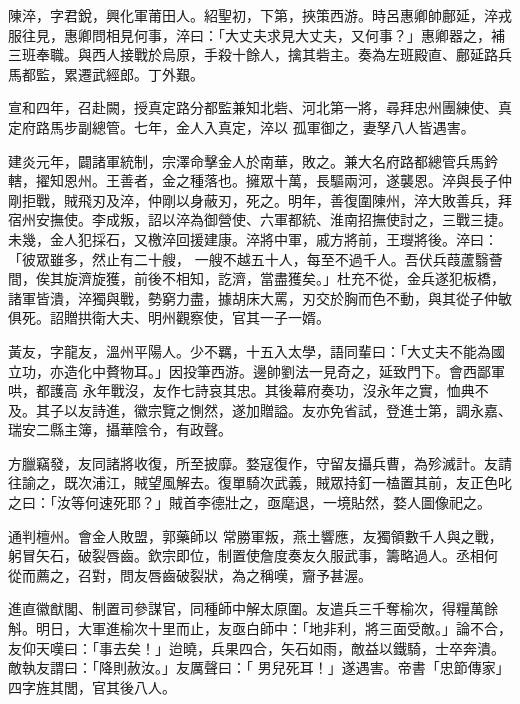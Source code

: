 \begin{pinyinscope}
 陳淬，字君銳，興化軍莆田人。紹聖初，下第，挾策西游。時呂惠卿帥鄜延，淬戎服往見，惠卿問相見何事，淬曰：「大丈夫求見大丈夫，又何事？」惠卿器之，補三班奉職。與西人接戰於烏原，手殺十餘人，擒其砦主。奏為左班殿直、鄜延路兵馬都監，累遷武經郎。丁外艱。



 宣和四年，召赴闕，授真定路分都監兼知北砦、河北第一將，尋拜忠州團練使、真定府路馬步副總管。七年，金人入真定，淬以
 孤軍御之，妻孥八人皆遇害。



 建炎元年，闢諸軍統制，宗澤命擊金人於南華，敗之。兼大名府路都總管兵馬鈐轄，擢知恩州。王善者，金之種落也。擁眾十萬，長驅兩河，遂襲恩。淬與長子仲剛拒戰，賊飛刃及淬，仲剛以身蔽刃，死之。明年，善復圍陳州，淬大敗善兵，拜宿州安撫使。李成叛，詔以淬為御營使、六軍都統、淮南招撫使討之，三戰三捷。未幾，金人犯採石，又檄淬回援建康。淬將中軍，戚方將前，王𤫉將後。淬曰：「彼眾雖多，然止有二十艘，
 一艘不越五十人，每至不過千人。吾伏兵葭蘆翳薈間，俟其旋濟旋獲，前後不相知，訖濟，當盡獲矣。」杜充不從，金兵遂犯板橋，諸軍皆潰，淬獨與戰，勢窮力盡，據胡床大罵，刃交於胸而色不動，與其從子仲敏俱死。詔贈拱衛大夫、明州觀察使，官其一子一婿。



 黃友，字龍友，溫州平陽人。少不羈，十五入太學，語同輩曰：「大丈夫不能為國立功，亦造化中贅物耳。」因投筆西游。邊帥劉法一見奇之，延致門下。會西鄙軍哄，都護高
 永年戰沒，友作七詩哀其忠。其後幕府奏功，沒永年之實，恤典不及。其子以友詩進，徽宗覽之惻然，遂加贈謚。友亦免省試，登進士第，調永嘉、瑞安二縣主簿，攝華陰令，有政聲。



 方臘竊發，友同諸將收復，所至披靡。婺寇復作，守留友攝兵曹，為殄滅計。友請往諭之，既次浦江，賊望風解去。復單騎次武義，賊眾持釘一榼置其前，友正色叱之曰：「汝等何速死耶？」賊首李德壯之，亟麾退，一境貼然，婺人圖像祀之。



 通判檀州。會金人敗盟，郭藥師以
 常勝軍叛，燕土響應，友獨領數千人與之戰，躬冒矢石，破裂唇齒。欽宗即位，制置使詹度奏友久服武事，籌略過人。丞相何𬃄從而薦之，召對，問友唇齒破裂狀，為之稱嘆，齎予甚渥。



 進直徽猷閣、制置司參謀官，同種師中解太原圍。友遣兵三千奪榆次，得糧萬餘斛。明日，大軍進榆次十里而止，友亟白師中：「地非利，將三面受敵。」論不合，友仰天嘆曰：「事去矣！」迨曉，兵果四合，矢石如雨，敵益以鐵騎，士卒奔潰。敵執友謂曰：「降則赦汝。」友厲聲曰：「
 男兒死耳！」遂遇害。帝書「忠節傳家」四字旌其閭，官其後八人。




\end{pinyinscope}

